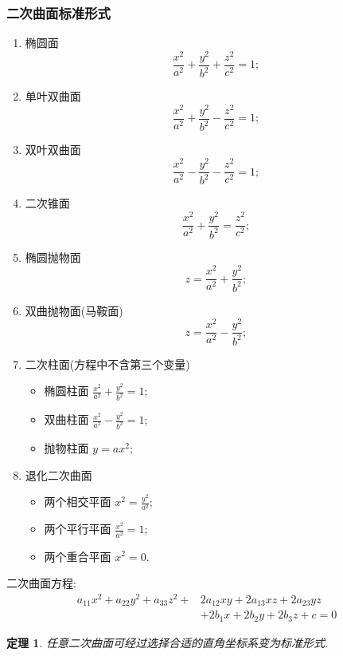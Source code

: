 \documentclass{article}
\newtheorem{theorem}{定理}  %
\begin{document}
\subsubsection{二次曲面标准形式}
\begin{enumerate}
\item 椭圆面
\[\frac{x^2}{a^2}+\frac{y^2}{b^2}+\frac{z^2}{c^2}=1;\]
\item 单叶双曲面
\[\frac{x^2}{a^2}+\frac{y^2}{b^2}-\frac{z^2}{c^2}=1;\]
\item 双叶双曲面
\[\frac{x^2}{a^2}-\frac{y^2}{b^2}-\frac{z^2}{c^2}=1;\]
\item 二次锥面
\[\frac{x^2}{a^2}+\frac{y^2}{b^2}=\frac{z^2}{c^2};\]
\end{enumerate}
\begin{enumerate}\setcounter{enumi}{4}
\item 椭圆抛物面
\[z=\frac{x^2}{a^2}+\frac{y^2}{b^2};\]
\item 双曲抛物面(马鞍面)
\[z=\frac{x^2}{a^2}-\frac{y^2}{b^2};\]
\item 二次柱面(方程中不含第三个变量)
\begin{itemize}
\item 椭圆柱面   $\frac{x^2}{a^2}+\frac{y^2}{b^2}=1$;
\item 双曲柱面   $\frac{x^2}{a^2}-\frac{y^2}{b^2}=1$;
\item 抛物柱面   $y=ax^2$;
\end{itemize}
\item 退化二次曲面
\begin{itemize}
\item 两个相交平面 $x^2=\frac{y^2}{a^2}$;
\item 两个平行平面 $\frac{x^2}{a^2}=1$;
\item 两个重合平面 $x^2=0$.
\end{itemize}
\end{enumerate}
二次曲面方程:
\begin{equation*}
\begin{split}
a_{11}x^2+a_{22}y^2+a_{33}z^2+& 2a_{12}xy+2a_{13}xz+2a_{23}yz\\
&+2b_1x+2b_2y+2b_3z+c=0
\end{split}
\end{equation*}
\begin{theorem}
任意二次曲面可经过选择合适的直角坐标系变为标准形式.
\end{theorem}
\end{document}
